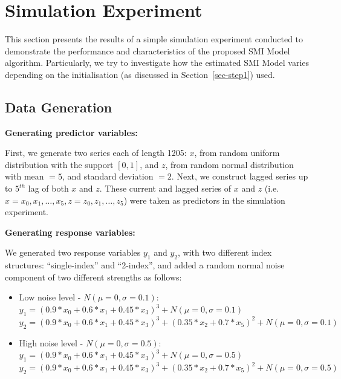 \documentclass[11pt,a4paper,]{article}
\begin{document}
\hypertarget{sec-simulation}{%
\section{Simulation Experiment}\label{sec-simulation}}

This section presents the results of a simple simulation experiment
conducted to demonstrate the performance and characteristics of the
proposed SMI Model algorithm. Particularly, we try to investigate how
the estimated SMI Model varies depending on the initialisation (as
discussed in Section~\ref{sec-step1}) used.

\hypertarget{sec-datagen}{%
\subsection{Data Generation}\label{sec-datagen}}

\textbf{Generating predictor variables:}

First, we generate two series each of length 1205: \(x\), from random
uniform distribution with the support \([0, 1]\), and \(z\), from random
normal distribution with mean \(= 5\), and standard deviation \(= 2\).
Next, we construct lagged series up to \(5^{th}\) lag of both \(x\) and
\(z\). These current and lagged series of \(x\) and \(z\)
(i.e.~\(x = x_{0}, x_{1}, \dots, x_{5}, z = z_{0}, z_{1}, \dots, z_{5}\))
were taken as predictors in the simulation experiment.

\textbf{Generating response variables:}

We generated two response variables \(y_{1}\) and \(y_{2}\), with two
different index structures: ``single-index'' and ``2-index'', and added
a random normal noise component of two different strengths as follows:

\begin{itemize}
\item
  Low noise level - \(N(\mu = 0, \sigma = 0.1)\):\\
  \(y_{1} = (0.9*x_{0} + 0.6*x_{1} + 0.45*x_{3})^3 + N(\mu = 0, \sigma = 0.1)\)\\
  \(y_{2} = (0.9*x_{0} + 0.6*x_{1} + 0.45*x_{3})^3 + (0.35*x_{2} + 0.7*x_{5})^2 + N(\mu = 0, \sigma = 0.1)\)
\item
  High noise level - \(N(\mu = 0, \sigma = 0.5)\):\\
  \(y_{1} = (0.9*x_{0} + 0.6*x_{1} + 0.45*x_{3})^3 + N(\mu = 0, \sigma = 0.5)\)\\
  \(y_{2} = (0.9*x_{0} + 0.6*x_{1} + 0.45*x_{3})^3 + (0.35*x_{2} + 0.7*x_{5})^2 + N(\mu = 0, \sigma = 0.5)\)
\end{itemize}
\end{document}
